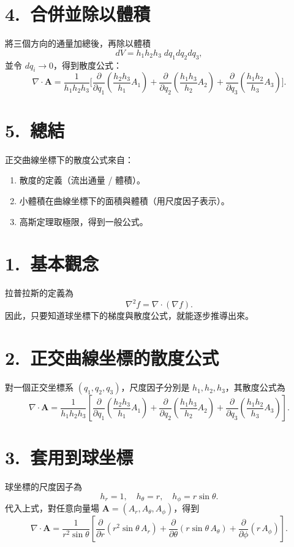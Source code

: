 \documentclass{article}
\begin{document}
\section*{4.~合併並除以體積}
將三個方向的通量加總後，再除以體積
\[
dV = h_1 h_2 h_3 \; dq_1 dq_2 dq_3,
\]
並令 $dq_i \to 0$，得到散度公式：
\[
\nabla \cdot \mathbf{A}
= \frac{1}{h_1 h_2 h_3}
\Bigg[
\frac{\partial}{\partial q_1}\!\left(\frac{h_2 h_3}{h_1}A_1\right)
+ \frac{\partial}{\partial q_2}\!\left(\frac{h_1 h_3}{h_2}A_2\right)
+ \frac{\partial}{\partial q_3}\!\left(\frac{h_1 h_2}{h_3}A_3\right)
\Bigg].
\]

\section*{5.~總結}
正交曲線坐標下的散度公式來自：
\begin{enumerate}
    \item 散度的定義（流出通量 / 體積）。
    \item 小體積在曲線坐標下的面積與體積（用尺度因子表示）。
    \item 高斯定理取極限，得到一般公式。
\end{enumerate}
\section*{1.~基本觀念}
拉普拉斯的定義為
\[
\nabla^2 f = \nabla \cdot (\nabla f).
\]
因此，只要知道球坐標下的梯度與散度公式，就能逐步推導出來。

\section*{2.~正交曲線坐標的散度公式}
對一個正交坐標系 $(q_1,q_2,q_3)$，尺度因子分別是 $h_1,h_2,h_3$，其散度公式為
\[
\nabla \cdot \mathbf{A}
= \frac{1}{h_1 h_2 h_3}
\left[
\frac{\partial}{\partial q_1}\!\left(\frac{h_2 h_3}{h_1} A_1\right)
+ \frac{\partial}{\partial q_2}\!\left(\frac{h_1 h_3}{h_2} A_2\right)
+ \frac{\partial}{\partial q_3}\!\left(\frac{h_1 h_2}{h_3} A_3\right)
\right].
\]

\section*{3.~套用到球坐標}
球坐標的尺度因子為
\[
h_r = 1, \quad h_\theta = r, \quad h_\phi = r\sin\theta.
\]
代入上式，對任意向量場 $\mathbf{A} = (A_r,A_\theta,A_\phi)$，得到
\[
\nabla \cdot \mathbf{A} =
\frac{1}{r^2 \sin\theta}
\left[
\frac{\partial}{\partial r}\!\left(r^2 \sin\theta \, A_r\right)
+ \frac{\partial}{\partial \theta}\!\left(r \sin\theta \, A_\theta\right)
+ \frac{\partial}{\partial \phi}\!\left(r \, A_\phi\right)
\right].
\]
\end{document}
